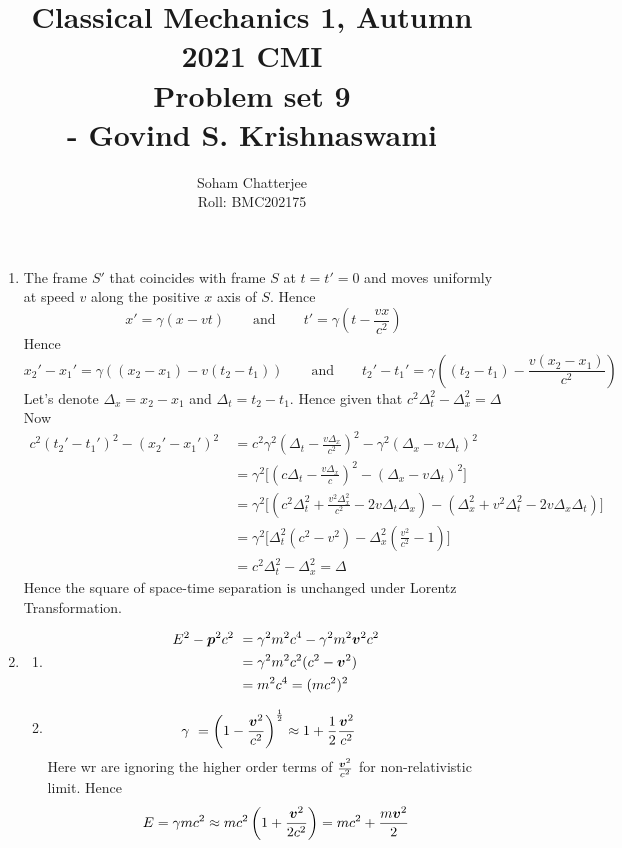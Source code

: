\documentclass{article}
\title{\huge{Classical Mechanics 1, Autumn 2021 CMI \\ Problem set 9\\\hspace{7cm}- Govind S. Krishnaswami}
}
\author{Soham Chatterjee\\Roll: BMC202175}
\date{}
\newcommand{\delx}{\Delta_x}
\newcommand{\delt}{\Delta_t}
\begin{document}
	
	
	\maketitle\pagebreak
	
	\begin{enumerate}
		\item The frame $S'$ that coincides with frame $S$ at $t = t' = 0$ and moves uniformly at speed $v$ along the positive $x$ axis of $S$. Hence $$x'=\gamma(x-vt)\qquad \text{and}\qquad  t'=\gamma\left(t-\frac{vx}{c^2}\right)$$Hence $$x_2'-x_1'=\gamma((x_2-x_1)-v(t_2-t_1))\qquad\text{and}\qquad t_2'-t_1'=\gamma\left((t_2-t_1)-\frac{v(x_2-x_1)}{c^2}\right)$$Let's denote $\delx=x_2-x_1$ and $\delt=t_2-t_1$. Hence given that $c^2\delt^2-\delx^2=\Delta$ Now\begin{align*}
			c^2(t_2'-t_1')^2-(x_2'-x_1')^2\ &=c^2\gamma^2\left(\delt-\frac{v\delx}{c^2} \right)^2- \gamma^2(\delx-v\delt)^2\\
			&=\gamma^2\Bigg[\left(c\delt-\frac{v\delx}{c} \right)^2- (\delx-v\delt)^2\Bigg]\\
			&=\gamma^2\Bigg[\left( c^2\delt^2+\frac{v^2\delx^2}{c^2}-2v\delt\delx\right) -(\delx^2+v^2\delt^2-2v\delx\delt)\Bigg]\\
			&=\gamma^2\Bigg[\delt^2\left(c^2-v^2 \right)-\delx^2\left(\frac{v^2}{c^2}-1\right) \Bigg]\\
			&=c^2\delt^2-\delx^2=\Delta
		\end{align*}
		Hence the square of space-time separation is unchanged under Lorentz Transformation.
		\item \begin{enumerate}
			\item \begin{align*}
				E^2-\boldsymbol{p}^2c^2 \ & =\gamma^2  m^2c^4-\gamma^2m^2\boldsymbol{v}^2c^2 \\
				                & =\gamma^2m^2c^2(c^2-\boldsymbol{v}^2)\\
				                & =m^2c^4=(mc^2)^2
			\end{align*}
			\item \begin{align*}
				\gamma \ &=\left(1-\frac{\boldsymbol{v}^2}{c^2} \right)^{\frac12}\approx1+\frac12\frac{\boldsymbol{v}^2}{c^2}
			\end{align*}Here wr are ignoring the higher order terms of $\frac{\boldsymbol{v}^2}{c^2}$ for non-relativistic limit. Hence\begin{align*}
			&E=\gamma mc^2\approx mc^2\left(1+\frac{\bmv^2}{2c^2}\right)=mc^2+\frac{m\bmv^2}{2}\\

\end{align*}
\end{enumerate}
\end{enumerate}
\end{document}
